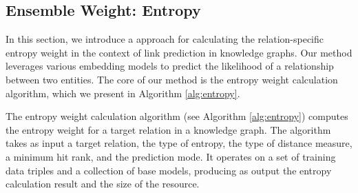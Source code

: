 \documentclass{article}
\begin{document}
\subsection{Ensemble Weight: Entropy}

In this section, we introduce a approach for calculating the relation-specific entropy weight in the context of link prediction in knowledge graphs. Our method leverages various embedding models to predict the likelihood of a relationship between two entities. The core of our method is the entropy weight calculation algorithm, which we present in Algorithm \ref{alg:entropy}. 

The entropy weight calculation algorithm (see Algorithm \ref{alg:entropy}) computes the entropy weight for a target relation in a knowledge graph. The algorithm takes as input a target relation, the type of entropy, the type of distance measure, a minimum hit rank, and the prediction mode. It operates on a set of training data triples and a collection of base models, producing as output the entropy calculation result and the size of the resource.
\end{document}
